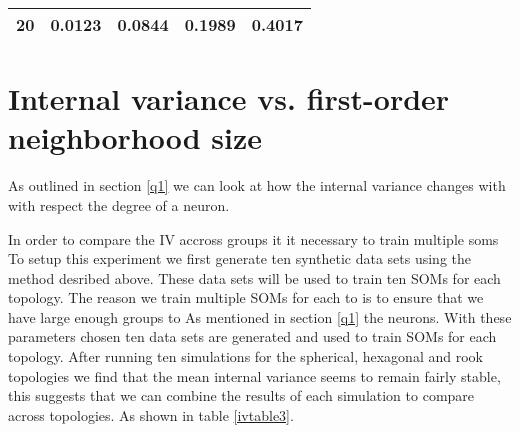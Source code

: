\begin{table}
{\begin{tabular}{|c||c|c|c|c|}
  \hline
  \textbf{20} & 0.0123& 0.0844& 0.1989& 0.4017 \\
  \hline
  \end{tabular} 
  \label{ivtable1:graph}
} 
\end{table}






\section{Internal variance vs. first-order neighborhood size}
As outlined in section \ref{q1} we can look at how the internal variance
changes with with respect the degree of a neuron.  

In order to compare the IV accross groups it it necessary to train multiple
soms 
To setup this experiment we
first generate ten synthetic data sets using the method desribed above.  These
data sets will be used to train ten SOMs for each topology.  The reason we
train multiple SOMs for each to is to ensure that we have large enough groups to 
As mentioned in section \ref{q1} the neurons.
With these parameters chosen ten data sets are generated and used to train
SOMs for each topology.  After running ten simulations for the spherical,
hexagonal and rook topologies we find that the mean internal variance seems to
remain fairly stable, this suggests that we can combine the results of each
simulation to compare across topologies. As shown in table \ref{ivtable3}.

